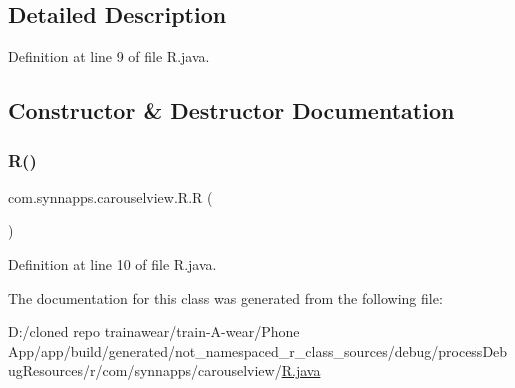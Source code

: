 \subsection{Detailed Description}


Definition at line 9 of file R.\+java.



\subsection{Constructor \& Destructor Documentation}
\mbox{\label{classcom_1_1synnapps_1_1carouselview_1_1_r_a5e75877ef0f4ca77bd243cb74dcfee95}} 
\subsubsection{\texorpdfstring{R()}{R()}}
{\footnotesize\ttfamily com.\+synnapps.\+carouselview.\+R.\+R (\begin{DoxyParamCaption}{ }\end{DoxyParamCaption})\hspace{0.3cm}{\ttfamily [private]}}



Definition at line 10 of file R.\+java.


\begin{DoxyCode}{0}

\end{DoxyCode}


The documentation for this class was generated from the following file\+:\begin{DoxyCompactItemize}
\item 
D\+:/cloned repo trainawear/train-\/\+A-\/wear/\+Phone App/app/build/generated/not\+\_\+namespaced\+\_\+r\+\_\+class\+\_\+sources/debug/process\+Debug\+Resources/r/com/synnapps/carouselview/\mbox{\hyperlink{process_debug_resources_2r_2com_2synnapps_2carouselview_2_r_8java}{R.\+java}}\end{DoxyCompactItemize}
